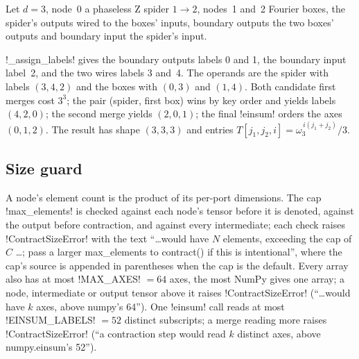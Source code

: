 \begin{example}\label{ex:semantics-numeric}
Let $d=3$, node~0 a phaseless Z spider $1\to2$, nodes~1 and~2 Fourier boxes, the spider's outputs wired to the boxes' inputs, boundary outputs the two boxes' outputs and boundary input the spider's input.
\begin{center}
\end{center}
\py!_assign_labels! gives the boundary outputs labels 0 and 1, the boundary input label~2, and the two wires labels 3 and~4. The operands are the spider with labels $(3,4,2)$ and the boxes with $(0,3)$ and $(1,4)$. Both candidate first merges cost $3^3$; the pair (spider, first box) wins by key order and yields labels $(4,2,0)$; the second merge yields $(2,0,1)$; the final \py!einsum! orders the axes $(0,1,2)$. The result has shape $(3,3,3)$ and entries $T[j_1,j_2,i]=\omega_3^{\,i(j_1+j_2)}/3$.
\end{example}

\subsection{Size guard}

A node's element count is the product of its per-port dimensions. The cap \py!max_elements! is checked against each node's tensor before it is denoted, against the output before contraction, and against every intermediate; each check raises \py!ContractSizeError! with the text ``\ldots would have $N$ elements, exceeding the cap of $C$ \ldots; pass a larger max\_elements to contract() if this is intentional'', where the cap's source is appended in parentheses when the cap is the default. Every array also has at most \py!MAX_AXES! $=64$ axes, the most NumPy gives one array; a node, intermediate or output tensor above it raises \py!ContractSizeError! (``\ldots would have $k$ axes, above numpy's 64''). One \py!einsum! call reads at most \py!EINSUM_LABELS! $=52$ distinct subscripts; a merge reading more raises \py!ContractSizeError! (``a contraction step would read $k$ distinct axes, above numpy.einsum's 52'').

